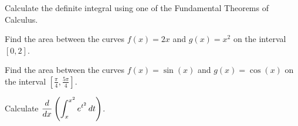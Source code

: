 \begin{questions}
\begin{multicols}{3}
\end{multicols}

\question Calculate the definite integral using one of the Fundamental Theorems of Calculus.

\newpage

\question Find the area between the curves $f(x)=2x$ and $g(x)=x^2$ on the interval $[0,2]$.
\begin{solutionorbox}[2.5in]

\end{solutionorbox}

\question Find the area between the curves $f(x)=\sin(x)$ and $g(x)=\cos(x)$ on the interval $\displaystyle \left[\frac{\pi}{4}, \frac{5\pi}{4}\right]$.
\begin{solutionorbox}[2.5in]

\end{solutionorbox}

\question Calculate $\displaystyle\displaystyle \frac{d}{dx}\left(\displaystyle \int_{x}^{x^2} e^{t^2} \,d{t}\right)$.
\begin{solutionorbox}[3in]

\end{solutionorbox}




\end{questions}